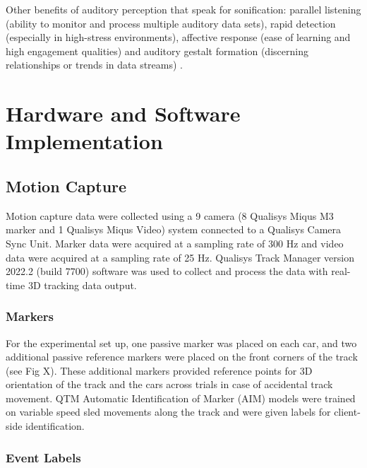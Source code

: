 \documentclass[10pt,a4paper,onecolumn]{article}
\begin{document}
Other benefits of auditory perception that speak for sonification: parallel listening (ability to monitor and process multiple auditory data sets), rapid detection (especially in high-stress environments), affective response (ease of learning and high engagement qualities) and auditory gestalt formation (discerning relationships or trends in data streams) \autocite{kramerSonificationReportStatus1999}.

\hypertarget{hardware-and-software-implementation}{%
\section{Hardware and Software Implementation}\label{hardware-and-software-implementation}}

\hypertarget{motion-capture}{%
\subsection{Motion Capture}\label{motion-capture}}

Motion capture data were collected using a 9 camera (8 Qualisys Miqus M3 marker and 1 Qualisys Miqus Video) system connected to a Qualisys Camera Sync Unit.
Marker data were acquired at a sampling rate of 300 Hz and video data were acquired at a sampling rate of 25 Hz. Qualisys Track Manager version 2022.2 (build 7700) software was used to collect and process the data with real-time 3D tracking data output.

\hypertarget{markers}{%
\subsubsection{Markers}\label{markers}}

For the experimental set up, one passive marker was placed on each car, and two additional passive reference markers were placed on the front corners of the track (see Fig X). These additional markers provided reference points for 3D orientation of the track and the cars across trials in case of accidental track movement. QTM Automatic Identification of Marker (AIM) models were trained on variable speed sled movements along the track and were given labels for client-side identification.

\hypertarget{event-labels}{%
\subsubsection{Event Labels}\label{event-labels}}
\end{document}
